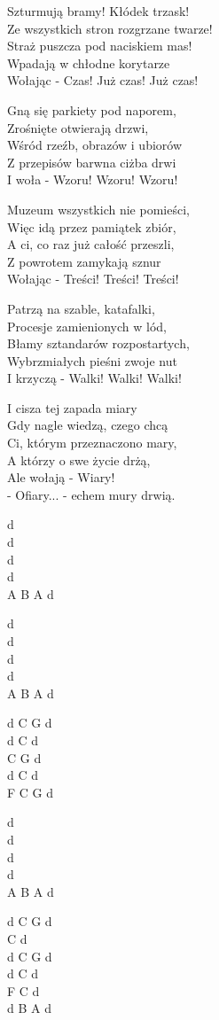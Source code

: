 \begin{text}
    Szturmują bramy! Kłódek trzask!\\
    Ze wszystkich stron rozgrzane twarze!\\
    Straż puszcza pod naciskiem mas!\\
    Wpadają w chłodne korytarze\\
    Wołając - Czas! Już czas! Już czas!

    Gną się parkiety pod naporem,\\
    Zrośnięte otwierają drzwi,\\
    Wśród rzeźb, obrazów i ubiorów\\
    Z przepisów barwna ciżba drwi\\
    I woła - Wzoru! Wzoru! Wzoru!

    Muzeum wszystkich nie pomieści,\\
    Więc idą przez pamiątek zbiór,\\
    A ci, co raz już całość przeszli,\\
    Z powrotem zamykają sznur\\
    Wołając - Treści! Treści! Treści!

    Patrzą na szable, katafalki,\\
    Procesje zamienionych w lód,\\
    Błamy sztandarów rozpostartych,\\
    Wybrzmiałych pieśni zwoje nut\\
    I krzyczą - Walki! Walki! Walki!

    I cisza tej zapada miary\\
    Gdy nagle wiedzą, czego chcą\\
    Ci, którym przeznaczono mary,\\
    A którzy o swe życie drżą,\\
    Ale wołają - Wiary!\\
    - Ofiary... - echem mury drwią.
\end{text}
\begin{chord}
    d\\
    d\\
    d\\
    d\\
    A B A d

    d\\
    d\\
    d\\
    d\\
    A B A d

    d C G d\\
    d C d\\
    C G d\\
    d C d\\
    F C G d

    d\\
    d\\
    d\\
    d\\
    A B A d

    d C G d\\
    C d\\
    d C G d\\
    d C d\\
    F C d\\
    d B A d
\end{chord}